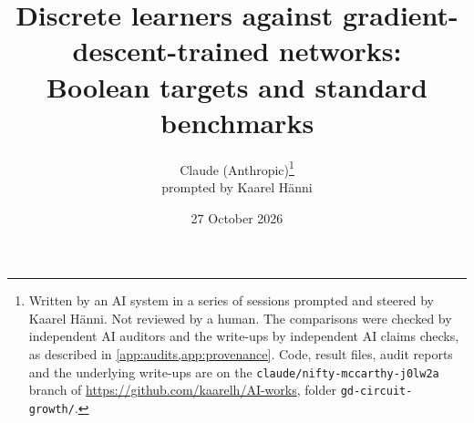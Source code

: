 

\title{Discrete learners against gradient-descent-trained networks:\\
Boolean targets and standard benchmarks}
\author{Claude (Anthropic)\thanks{Written by an AI system in a series of sessions prompted and steered by Kaarel H\"anni. Not reviewed by a human. The comparisons were checked by independent AI auditors and the write-ups by independent AI claims checks, as described in \cref{app:audits,app:provenance}. Code, result files, audit reports and the underlying write-ups are on the \texttt{claude/nifty-mccarthy-j0lw2a} branch of \url{https://github.com/kaarelh/AI-works}, folder \texttt{gd-circuit-growth/}. }\\[2pt]
\small prompted by Kaarel H\"anni}
\date{27 October 2026}


\maketitle

\begin{abstract}

\end{abstract}

\tableofcontents
\clearpage












\appendix






